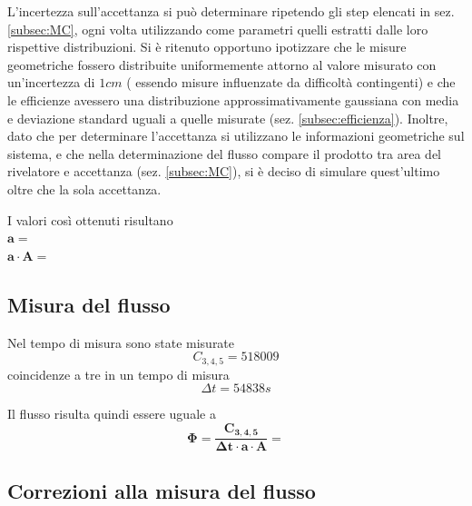 \documentclass[11pt]{article}
\begin{document}
L'incertezza sull'accettanza si può determinare ripetendo gli step elencati in sez. \ref{subsec:MC}, ogni volta utilizzando come parametri quelli estratti dalle loro rispettive distribuzioni. Si è ritenuto opportuno ipotizzare che le misure geometriche fossero distribuite uniformemente attorno al valore misurato con un'incertezza di $1 cm$ ( essendo misure influenzate da difficoltà contingenti) e che le efficienze avessero una distribuzione approssimativamente gaussiana con media e deviazione standard uguali a quelle misurate (sez. \ref{subsec:efficienza}). Inoltre, dato che per determinare l'accettanza si utilizzano le informazioni geometriche sul sistema, e che nella determinazione del flusso compare il prodotto tra area del rivelatore e accettanza (sez. \ref{subsec:MC}), si è deciso di simulare quest'ultimo oltre che la sola accettanza.

I valori così ottenuti risultano \\
$
\mathbf{a = } 
$
\\
$
\mathbf{ a \cdot A =  }
$


\subsection{Misura del flusso}
Nel tempo di misura sono state misurate \\
\begin{equation}
C_{3,4,5} = 518009
\nonumber
\end{equation}
coincidenze a tre in un tempo di misura \\
\begin{equation}
\Delta t = 54838 s
\nonumber
\end{equation}

Il flusso risulta quindi essere uguale a \\
\begin{equation}
\mathbf{\Phi = \frac{C_{3,4,5}}{\Delta t \cdot a \cdot A} = } 
\nonumber
\end{equation}

\subsection{Correzioni alla misura del flusso}



\end{document}
